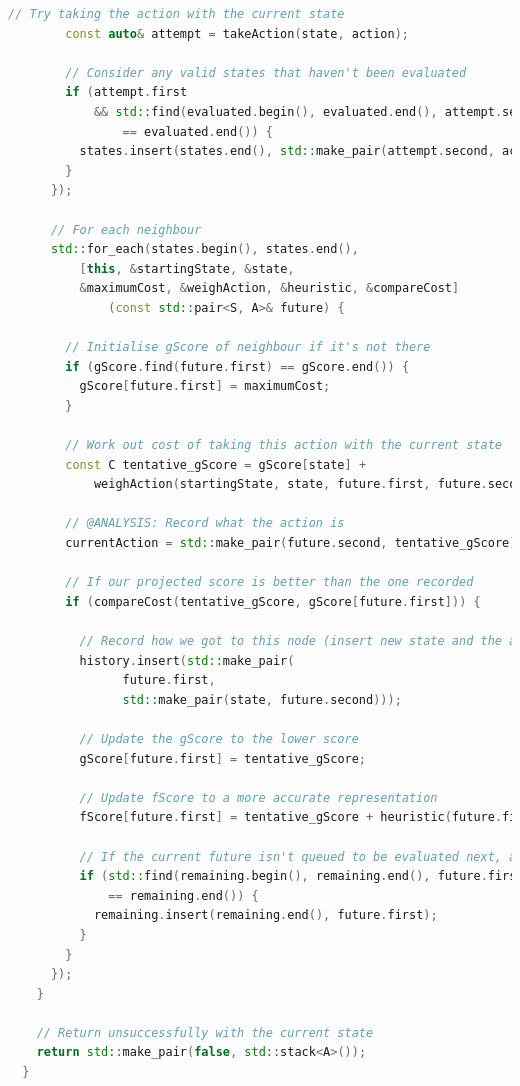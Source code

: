 \documentclass[11pt, a4paper]{report}
\begin{document}
\begin{appendices}
\begin{lstlisting}[language=C++]
        // Try taking the action with the current state
        const auto& attempt = takeAction(state, action);

        // Consider any valid states that haven't been evaluated
        if (attempt.first 
            && std::find(evaluated.begin(), evaluated.end(), attempt.second)
                == evaluated.end()) {
          states.insert(states.end(), std::make_pair(attempt.second, action));
        }
      });

      // For each neighbour
      std::for_each(states.begin(), states.end(),
          [this, &startingState, &state, 
          &maximumCost, &weighAction, &heuristic, &compareCost] 
              (const std::pair<S, A>& future) {

        // Initialise gScore of neighbour if it's not there
        if (gScore.find(future.first) == gScore.end()) {
          gScore[future.first] = maximumCost;
        }

        // Work out cost of taking this action with the current state
        const C tentative_gScore = gScore[state] + 
            weighAction(startingState, state, future.first, future.second);

        // @ANALYSIS: Record what the action is
        currentAction = std::make_pair(future.second, tentative_gScore);

        // If our projected score is better than the one recorded
        if (compareCost(tentative_gScore, gScore[future.first])) {

          // Record how we got to this node (insert new state and the action)
          history.insert(std::make_pair(
                future.first, 
                std::make_pair(state, future.second)));

          // Update the gScore to the lower score
          gScore[future.first] = tentative_gScore;

          // Update fScore to a more accurate representation
          fScore[future.first] = tentative_gScore + heuristic(future.first);

          // If the current future isn't queued to be evaluated next, add it
          if (std::find(remaining.begin(), remaining.end(), future.first) 
              == remaining.end()) {
            remaining.insert(remaining.end(), future.first);
          }
        }
      });
    }

    // Return unsuccessfully with the current state
    return std::make_pair(false, std::stack<A>());
  }


\end{lstlisting}
\end{appendices}
\end{document}

